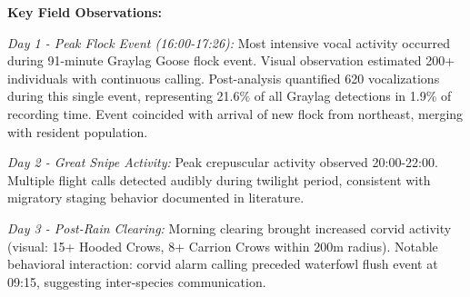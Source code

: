 \documentclass[twocolumn]{article}
\begin{document}
\textbf{Key Field Observations:}

\textit{Day 1 - Peak Flock Event (16:00-17:26):} Most intensive vocal activity occurred during 91-minute Graylag Goose flock event. Visual observation estimated 200+ individuals with continuous calling. Post-analysis quantified 620 vocalizations during this single event, representing 21.6\% of all Graylag detections in 1.9\% of recording time. Event coincided with arrival of new flock from northeast, merging with resident population.

\textit{Day 2 - Great Snipe Activity:} Peak crepuscular activity observed 20:00-22:00. Multiple flight calls detected audibly during twilight period, consistent with migratory staging behavior documented in literature.

\textit{Day 3 - Post-Rain Clearing:} Morning clearing brought increased corvid activity (visual: 15+ Hooded Crows, 8+ Carrion Crows within 200m radius). Notable behavioral interaction: corvid alarm calling preceded waterfowl flush event at 09:15, suggesting inter-species communication.
\end{document}
